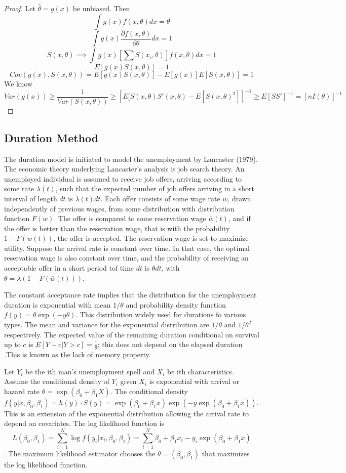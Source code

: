 \documentclass[11pt, a4paper, oneside]{article}
\theoremstyle{definition}
\theoremstyle{proposition}
\theoremstyle{corollary}
\theoremstyle{lemma}
\theoremstyle{theorem}
\begin{document}
\begin{proof}
Let $\hat{\theta} = g(x)$ be unbiased. Then
$$\int g(x)f(x, \theta)dx = \theta$$
$$\int g(x)\frac{\partial f(x, \theta)}{\partial \theta} dx = 1$$
$$S(x, \theta) \implies \int g(x)[\sum S(x_i, \theta)] f(x, \theta)dx = 1$$
$$E[g(x)S(x, \theta)] = 1$$
$$Cov(g(x), S(x, \theta)) = E[g(x)S(x, \theta)] -E[g(x)]E[S(x, \theta)] = 1$$
We know
$$Var(g(x)) \geq \frac{1}{Var(S(x, \theta))} \geq \left[E[S(x,\theta)S'(x, \theta) - E[S(x, \theta)^2]\right]^{-1} \geq E[SS']^{-1} = [nI(\theta)]^{-1}$$
\end{proof}

\subsection{Duration Method}
The duration model is initiated to model the unemployment by Lancaster (1979). The economic theory underlying Lancaster's analysis is job search theory. An unemployed individual is assumed to receive job offers, arriving according to some rate $\lambda(t)$, such that the expected number of job offers arriving in a short interval of length $dt$ is $\lambda(t)dt$. Each offer consists of some wage rate $w$, drawn independently of previous wages, from some distribution with distribution function $F(w)$. The offer is compared to some reservation wage $\bar{w}(t)$, and if the offer is better than the reservation wage, that is with the probability $1-F(\bar{w}(t))$, the offer is accepted. The reservation wage is set to maximize utility. Suppose the arrival rate is constant over time. In that case, the optimal reservation wage is also constant over time, and the probability of receiving an acceptable offer in a short period tof time $dt$ is $\theta dt$, with $\theta=\lambda(1-F(\bar{w}(t)))$.  

The constant acceptance rate implies that the distribution for the unemployment duration is exponential with mean $1/\theta$ and probability density function $f(y) = \theta\exp(-y\theta)$. This distribution widely used for durations fo various types. The mean and variance for the exponential distribution are $1/\theta$ and $1/\theta^2$ respectively. The expected value of the remaining duration conditional on survival up to $c$ is $E[Y-c|Y>c]=\frac{1}{\theta}$; this does not depend on the elapsed duration .This is known as the lack of memory property. 

Let $Y_i$ be the ith man's unemployment spell and $X_i$ be ith characteristics. Assume the conditional density of $Y_i$ given $X_i$ is exponential with arrival or hazard rate $\theta = \exp(\beta_0+\beta_1X)$. The conditional density $f(y|x, \beta_0, \beta_1) = h(y)\cdot S(y) = \exp(\beta_0+\beta_1 x)\exp(-y\exp(\beta_0 +\beta_1x))$. This is an extension of the exponential distribution allowing the arrival rate to depend on covariates. The log likelihood function is $$L(\beta_0, \beta_1) = \sum_{i=1}^N \log{f(y_i|x_i, \beta_0, \beta_1)} = \sum_{i=1}^N \beta_0+\beta_1 x_i - y_i\exp(\beta_0+\beta_1x)$$. The maximum likelihood estimator chooses the $\theta = (\beta_0, \beta_1)$ that maximizes the log likelihood function. 
\end{document}
